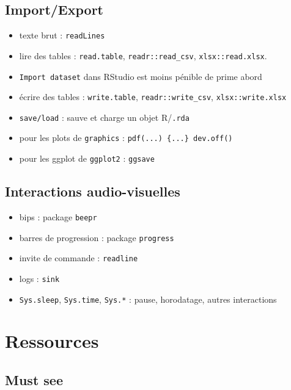 \documentclass[
  letterpaper,
  DIV=11,
  numbers=noendperiod]{scrreprt}
\providecommand{\tightlist}{%
  \setlength{\itemsep}{0pt}\setlength{\parskip}{0pt}}\usepackage{longtable,booktabs,array}
\begin{document}
\hypertarget{importexport}{%
\section{Import/Export}\label{importexport}}

\begin{itemize}
\tightlist
\item
  texte brut : \texttt{readLines}
\item
  lire des tables : \texttt{read.table}, \texttt{readr::read\_csv},
  \texttt{xlsx::read.xlsx}.
\item
  \texttt{Import\ dataset} dans RStudio est moins pénible de prime abord
\item
  écrire des tables : \texttt{write.table}, \texttt{readr::write\_csv},
  \texttt{xlsx::write.xlsx}
\item
  \texttt{save/load} : sauve et charge un objet R/\texttt{.rda}
\item
  pour les plots de \texttt{graphics} :
  \texttt{pdf(...)\ \{...\}\ dev.off()}
\item
  pour les ggplot de \texttt{ggplot2} : \texttt{ggsave}
\end{itemize}

\hypertarget{interactions-audio-visuelles}{%
\section{Interactions
audio-visuelles}\label{interactions-audio-visuelles}}

\begin{itemize}
\tightlist
\item
  bips : package \texttt{beepr}
\item
  barres de progression : package \texttt{progress}
\item
  invite de commande : \texttt{readline}
\item
  logs : \texttt{sink}
\item
  \texttt{Sys.sleep}, \texttt{Sys.time}, \texttt{Sys.*} : pause,
  horodatage, autres interactions
\end{itemize}


\hypertarget{ressources}{%
\chapter{Ressources}\label{ressources}}

\hypertarget{must-see}{%
\section{Must see}\label{must-see}}
\end{document}

